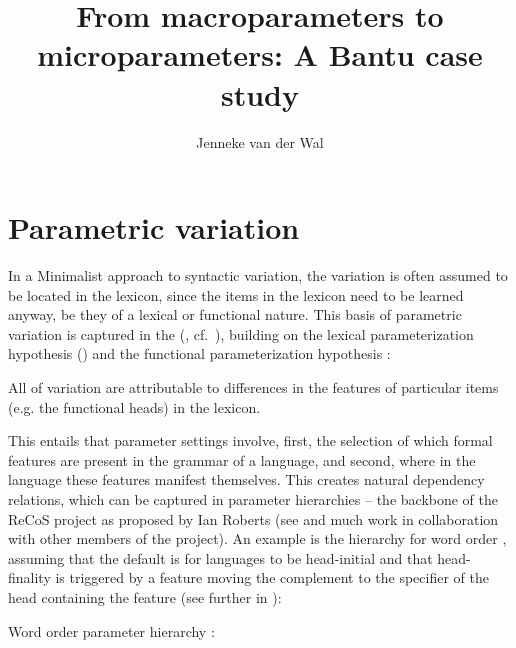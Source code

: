 \documentclass[output=paper]{langsci/langscibook}
\author{Jenneke van der Wal\affiliation{Leiden University}}
\title{From macroparameters to microparameters: A Bantu case study}
\begin{document}
\glsresetall

\section{Parametric variation}\label{bkm:Ref347925115}\label{sec:3.1}

In a Minimalist approach to syntactic variation, the variation is often assumed
to be located in the lexicon, since the items in the lexicon need to be learned
anyway, be they of a lexical or functional nature. This basis of parametric
variation is captured in the 
(\citealt[3]{Baker2008}, cf.\ \citealt{Borer1984,Chomsky1995}), building on the
lexical parameterization hypothesis (\citealt{ManziniWexler1987}) and the
functional parameterization hypothesis \citep{Fukui1995}:

\ea All  of variation are attributable to differences in the features
of particular items (e.g. the functional heads) in the lexicon.
\z

This entails that parameter settings involve, first, the selection of which
formal features are present in the grammar of a language, and second, where in
the language these features manifest themselves. This creates natural
dependency relations, which can be captured in parameter hierarchies – the
backbone of the ReCoS project as proposed by Ian Roberts (see
\citealt{RobHol2010,Roberts2012} and much work in
collaboration with other members of the project). An example is the hierarchy
for word order \citep{Roberts2012}, assuming that the default is for languages
to be head-initial \citep{Kayne1994} and that head-finality is triggered by a
feature moving the complement to the specifier of the head containing the
feature (see further in ):

\ea\label{ex:vdwal:3.2} Word order parameter hierarchy \citep{Roberts2012}:
\z
\end{document}

